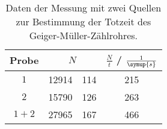 \begin{table}[!htp]
\centering
\caption{Daten der Messung mit zwei Quellen zur Bestimmung der Totzeit des Geiger-Müller-Zählrohres.}
\label{tab:tot}
\begin{tabular}{c S[table-format=5.0] @{${}\pm{}$} S[table-format=3.0] S[table-format=3.0]}
\toprule
{Probe} &  & {$\frac{N}{t}$ / $\frac{1}{\symup{s}}$} \\
\midrule
$1$ & 12914 & 114 & 215 \\
$2$ & 15790 & 126 & 263 \\
${1+2}$ & 27965 & 167 & 466 \\
\bottomrule
\end{tabular}
\end{table}